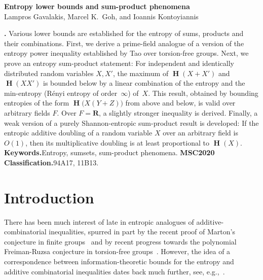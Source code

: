 \documentclass[twoside, 10pt]{article}
\title{}\author{}\date{}
\DeclareMathOperator{\Eta}{\mathbf{H}}
\newcommand{\RR}{\mathbf{R}}   %
\renewcommand{\maketitle}{%
  \begin{center}
    {\large\bf Entropy lower bounds and sum-product phenomena}\\
    \vskip 36pt
    {\sc Lampros Gavalakis, Marcel K.~Goh, {\rm and} Ioannis Kontoyiannis}
    \medskip
    \vskip 36pt
  \end{center}
}
\begin{document}
\maketitle
\renewenvironment{abstract}{\quotation\noindent\small{\bfseries\abstractname.\enspace}}{\endquotation}

\begin{abstract}%
Various lower bounds are established 
for the entropy of sums, products
and their combinations.
First, we derive a prime-field analogue of a version
of the entropy power  
inequality established by Tao over torsion-free groups. 
Next, we prove an entropy sum-product statement:
For independent and identically distributed 
random variables $X,X'$,
the maximum of $\Eta(X+X')$ and $\Eta(XX')$ 
is bounded below by a linear combination
of the entropy and the 
min-entropy (R\'enyi entropy of order~$\infty$)
of~$X$. This result, obtained by bounding 
entropies of the form $\Eta\bigl( X(Y+Z)\bigr)$ from above and below, 
is valid over arbitrary fields $F$. Over $F=\RR$, a slightly
stronger inequality is derived.
Finally, a weak version of a purely Shannon-entropic
sum-product result is developed:
If the entropic additive doubling of a random 
variable $X$ over an arbitrary field is $O(1)$,
then its multiplicative doubling is at least 
proportional to $\Eta(X)$.
\vskip5pt
\noindent\textbf{Keywords.}\enspace Entropy, sumsets, sum-product phenomena.
\vskip5pt
\noindent\textbf{MSC2020 Classification.}\enspace 94A17, 11B13.
\end{abstract}

\vskip48pt

\section{Introduction}

There has been much interest of late in entropic analogues of 
additive-combinatorial inequalities,
spurred in part by the recent proof of Marton's conjecture in finite 
groups~\cite{pfr,martontorsion} and by recent progress towards 
the polynomial Freiman-Ruzsa conjecture in torsion-free 
groups~\cite{pfrimproved}. However, the idea 
of a correspondence between 
information-theoretic bounds for the entropy
and additive combinatorial inequalities 
dates back much further, see, e.g.,~\cite{ruzsa2009,tao2010,KM:14}.
\end{document}
